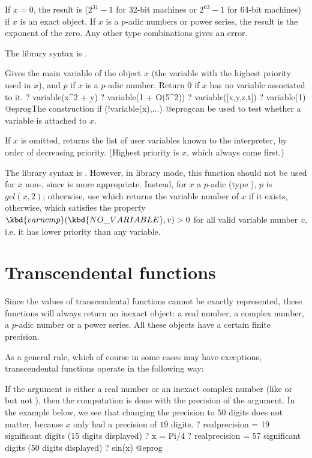 If $x=0$, the result is  ($2^{31}-1$ for 32-bit machines or
$2^{63}-1$ for 64-bit machines) if $x$ is an exact object. If $x$ is a
$p$-adic numbers or power series, the result is the exponent of the zero.
Any other type combinations gives an error.

The library syntax is .

\label{se:variable}
Gives the main variable of the object $x$ (the variable with the highest
priority used in $x$), and $p$ if $x$ is a $p$-adic number. Return $0$ if
$x$ has no variable associated to it.
\bprog
? variable(x^2 + y)
? variable(1 + O(5^2))
? variable([x,y,z,t])
? variable(1)
@eprog\noindent The construction
\bprog
   if (!variable(x),...)
@eprog\noindent can be used to test whether a variable is attached to $x$.

If $x$ is omitted, returns the list of user variables known to the
interpreter, by order of decreasing priority. (Highest priority is $x$,
which always come first.)

The library syntax is .
However, in library mode, this function should not be used for $x$
non-, since  is more appropriate. Instead, for
$x$ a $p$-adic (type ), $p$ is $gel(x,2)$; otherwise, use
 which returns the variable number of $x$ if
it exists,  otherwise, which satisfies the property
$\kbd{varncmp}(\kbd{NO\_VARIABLE}, v) > 0$ for all valid variable number
$v$, i.e. it has lower priority than any variable.

\section{Transcendental functions}\label{se:trans}

Since the values of transcendental functions cannot be exactly represented,
these functions will always return an inexact object: a real number,
a complex number, a $p$-adic number or a power series.  All these objects
have a certain finite precision.

As a general rule, which of course in some cases may have exceptions,
transcendental functions operate in the following way:

\item If the argument is either a real number or an inexact complex number
(like  or  but not ), then the
computation is done with the precision of the argument.
In the example below, we see that changing the precision to $50$ digits does
not matter, because $x$ only had a precision of $19$ digits.
\bprog
? 
   realprecision = 19 significant digits (15 digits displayed)
? x = Pi/4
? 
   realprecision = 57 significant digits (50 digits displayed)
? sin(x)
@eprog

